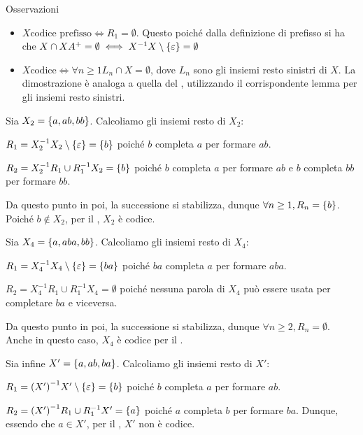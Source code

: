 \begin{note}{Osservazioni}
  \begin{itemize}
    \item \(X \text{codice prefisso} \iff R_1 = \emptyset\).
      Questo poiché dalla definizione di prefisso si ha che \(X \cap XA^+ = \emptyset \iff X^{-1}X \setminus \set{\varepsilon} = \emptyset\)
    \item \(X \text{codice} \iff \forall n \geq 1 L_n \cap X = \emptyset\),
      dove \(L_n\) sono gli insiemi resto sinistri di \(X\).
      La dimostrazione è analoga a quella del , utilizzando il corrispondente lemma per gli insiemi resto sinistri.
  \end{itemize}
\end{note}

\begin{example}{}
  Sia \(X_2 = \set{a,ab,bb}\). Calcoliamo gli insiemi resto di \(X_2\):

  \(R_1 = X_2^{-1}X_2 \setminus \set{\varepsilon} = \set{b}\)
  poiché \(b\) completa \(a\) per formare \(ab\).

  \(R_2 = X_2^{-1}R_1 \cup R_1^{-1}X_2 = \set{b}\)
  poiché \(b\) completa \(a\) per formare \(ab\) e \(b\) completa \(bb\) per formare \(bb\).

  Da questo punto in poi, la successione si stabilizza, dunque \(\forall n \geq 1, R_n = \set{b}\).
  Poiché \(b \not\in X_2\), per il , \(X_2\) è codice.

  Sia \(X_4 = \set{a,aba,bb}\). Calcoliamo gli insiemi resto di \(X_4\):
  
  \(R_1 = X_4^{-1}X_4 \setminus \set{\varepsilon} = \set{ba}\)
  poiché \(ba\) completa \(a\) per formare \(aba\).

  \(R_2 = X_4^{-1}R_1 \cup R_1^{-1}X_4 = \emptyset\)
  poiché nessuna parola di \(X_4\) può essere usata per completare \(ba\) e viceversa.
  
  Da questo punto in poi, la successione si stabilizza, dunque \(\forall n \geq 2, R_n = \emptyset\).
  Anche in questo caso, \(X_4\) è codice per il .

  Sia infine \(X' = \set{a,ab,ba}\). Calcoliamo gli insiemi resto di \(X'\):

  \(R_1 = {(X')}^{-1}X' \setminus \set{\varepsilon} = \set{b}\)
  poiché \(b\) completa \(a\) per formare \(ab\).
  
  \(R_2 = {(X')}^{-1}R_1 \cup R_1^{-1}X' = \set{a}\)
  poiché \(a\) completa \(b\) per formare \(ba\).
  Dunque, essendo che \(a \in X'\), per il , \(X'\) non è codice.
\end{example}

